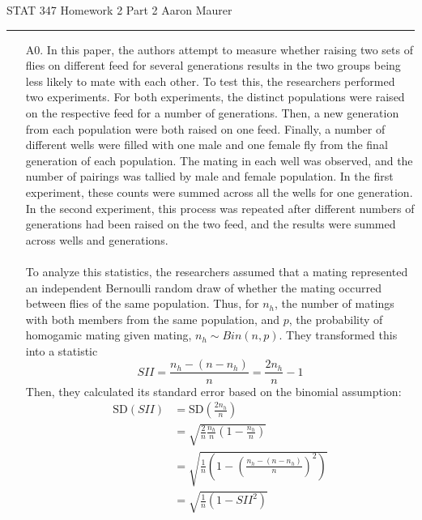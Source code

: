 \documentclass[11pt]{article}
\newcommand{\sd}{\mathrm{SD}}
\theoremstyle{definition}
\begin{document}
STAT 347 Homework 2 Part 2 \hfill Aaron Maurer
\vspace{2mm}
\hrule
\vspace{2mm}
\begin{itemize}
    \item[A0.]
        In this paper, the authors attempt to measure whether raising two sets of flies on different feed for several generations results in the two groups being less likely to mate with each other. To test this, the researchers performed two experiments. For both experiments, the distinct populations were raised on the respective feed for a number of generations. Then, a new generation from each population were both raised on one feed. Finally, a number of different wells were filled with one male and one female fly from the final generation of each population. The mating in each well was observed, and the number of pairings was tallied by male and female population. In the first experiment, these counts were summed across all the wells for one generation. In the second experiment, this process was repeated after different numbers of generations had been raised on the two feed, and the results were summed across wells and generations. \\
        \vspace{-2mm} \\
        To analyze this statistics, the researchers assumed that a mating represented an independent Bernoulli random draw of whether the mating occurred between flies of the same population. Thus, for $n_h$, the number of matings with both members from the same population, and $p$, the probability of homogamic mating given mating, $n_h\sim Bin(n,p)$. They transformed this into a statistic 
        \[ SII = \frac{n_h - (n-n_h)}{n} = \frac{2n_h}{n} - 1\]
        Then, they calculated its standard error based on the binomial assumption:
        \begin{align*}
            \sd(SII) &= \sd(\frac{2n_h}{n}) \\
                     &= \sqrt{\frac{2}{n}\frac{n_h}{n}\left(1-\frac{n_h}{n}\right)} \\
                     &= \sqrt{\frac{1}{n}\left(1-\left(\frac{n_h - (n-n_h)}{n}\right)^2\right)} \\
                     &= \sqrt{\frac{1}{n}\left(1-SII^2\right)} \\
        \end{align*}

\end{itemize}
\end{document}
